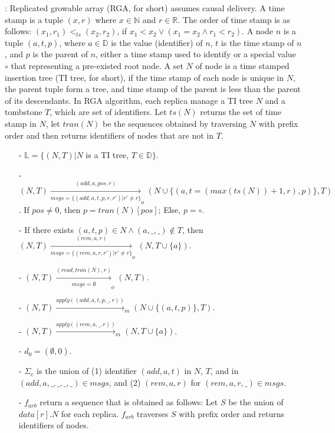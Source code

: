 {\color {red}
: Replicated growable array (RGA, for short) assumes causal delivery. A time stamp is a tuple $(x,r)$ where $x \in \mathbb{N}$ and $r \in \mathbb{R}$. The order of time stamp is as follows: $(x_1,r_1) <_{\mathit{ts}} (x_2,r_2)$, if $x_1 < x_2 \vee (x_1 = x_2 \wedge r_1 < r_2)$. A node $n$ is a tuple $(a,t,p)$, where $a \in \mathbb{D}$ is the value (identifier) of $n$, $t$ is the time stamp of $n$, and $p$ is the parent of $n$, either a time stamp used to identify or a special value $\circ$ that representing a pre-existed root node. A set $N$ of node is a time stamped insertion tree (TI tree, for short), if the time stamp of each node is unique in $N$, the parent tuple form a tree, and time stamp of the parent is less than the parent of its descendants. In RGA algorithm, each replica manage a TI tree $N$ and a tombstone $T$, which are set of identifiers. Let $\mathit{ts}(N)$ returns the set of time stamp in $N$, let $\mathit{tran}(N)$ be the sequences obtained by traversing $N$ with prefix order and then returns identifiers of nodes that are not in $T$.

\begin{itemize}
\setlength{\itemsep}{0.5pt}
\item[-] $\mathbb{L} = \{ (N,T) \vert N$ is a TI tree, $T \in \mathbb{D} \}$. 

\item[-] $(N,T) \xrightarrow[\mathit{msgs} = \{ (\mathit{add},a,t,p,r,r') \vert r' \neq r \}]{(\mathit{add},a,\mathit{pos},r)}_o (N \cup \{ (a,t=(\mathit{max}(\mathit{ts}(N))+1,r),p) \}, T)$. If $\mathit{pos} \neq 0$, then $p = \mathit{tran}(N)[\mathit{pos}]$; Else, $p = \circ$.

\item[-] If there exists $(a,t,p) \in N \wedge (a,\_,\_) \notin T$, then $(N,T) \xrightarrow[\mathit{msgs} = \{ (\mathit{rem},a,r,r') \vert r' \neq r \} ]{(\mathit{rem},a,r)}_o (N,T \cup \{ a \})$.

\item[-] $(N,T) \xrightarrow[\mathit{msgs} = \emptyset]{(\mathit{read},\mathit{tran}(N),r)}_o (N,T)$. 

\item[-] $(N,T) \xrightarrow{\mathit{apply}((\mathit{add},a,t,p,\_,r))}_m (N \cup \{ (a,t,p) \},T)$. 

\item[-] $(N,T) \xrightarrow{\mathit{apply}((\mathit{rem},a,\_,r))}_m (N,T \cup \{ a \})$.

\item[-] $d_0 = (\emptyset,0)$.

\item[-] $\Sigma_e$ is the union of (1) identifier $(\mathit{add},a,t)$ in $N$, $T$, and in $(\mathit{add},a,\_,\_,\_,\_) \in \mathit{msgs}$, and (2) $(\mathit{rem},a,r)$ for $(\mathit{rem},a,r,\_) \in \mathit{msgs}$.
\item[-] $f_{\mathit{arb}}$ return a sequence that is obtained as follows: Let $S$ be the union of $\mathit{data}[r].N$ for each replica. $f_{\mathit{arb}}$ traverses $S$ with prefix order and returns identifiers of nodes. 
\end{itemize}
}
